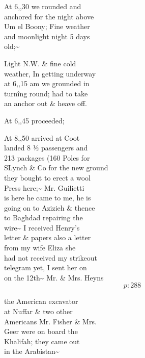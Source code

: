 \documentclass{report}
\begin{document}
	\par{
 	At 6,,30 we rounded and\ \\anchored for the night above\ \\Um el Boony; Fine weather\ \\and moonlight night 5 days\ \\old;\~{}\ \\
	}

	\par{
 	Light N.W. \& fine cold\ \\weather, In getting underway\ \\at 6,,15 am we grounded in\ \\turnîng round; had to take\ \\an anchor out \& heave off.\ \\
	}

	\par{
 	At 6,,45 proceeded;\ \\
	}

	\par{
 	At 8,,50 arrived at Coot\ \\landed 8 ½ passengers and\ \\213 packages (160 Poles for\ \\SLynch \& Co for the new ground\ \\they bought to erect a wool\ \\Press here;\~{} Mr. Guilietti\ \\is here he came to me, he is\ \\going on to Azizieh \& thence\ \\to Baghdad repairing the\ \\wire\~{} I received Henry’s\ \\letter \& papers also a letter\ \\from my wife Eliza she\ \\had not received my \lbrack strikeout\rbrack\ \\telegram yet, I sent her on\ \\on the 12th\~{} Mr. \& Mrs. Heyns\ \\
  \[p: 288 \]

	}


	\par{
 	the American excavator\ \\at Nuffar \& two other\ \\Americans Mr. Fisher \& Mrs.\ \\Geer were on board the\ \\Khalifah; they came out\ \\in the Arabistan\~{}\ \\
	}
\end{document}
